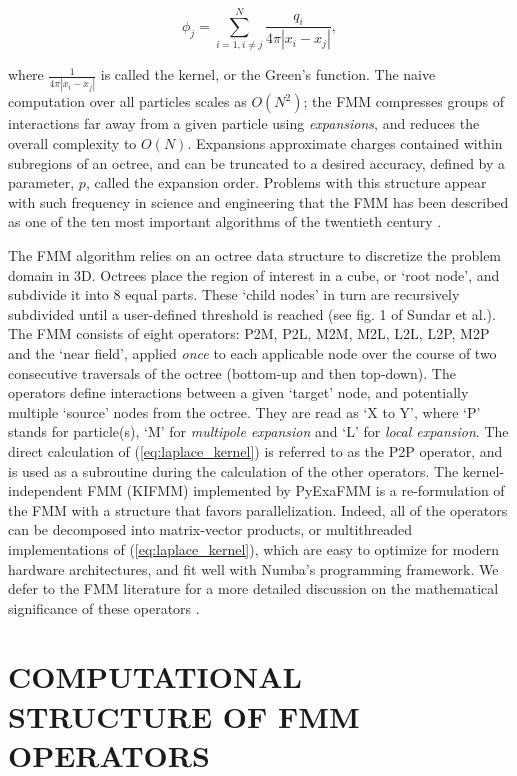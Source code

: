 \documentclass{IEEEcsmag}
\begin{document}
\begin{equation}
    \phi_j = \sum_{i=1, i \neq j}^{N} \frac{q_i}{4 \pi| x_i-x_j |},
    \label{eq:laplace_kernel}
\end{equation}

\noindent where $\frac{1}{4 \pi| x_i-x_j|}$ is called the kernel, or the Green's function. The naive computation over all particles scales as $O(N^2)$; the FMM compresses groups of interactions far away from a given particle using \textit{expansions}, and reduces the overall complexity to $O(N)$. Expansions approximate charges contained within subregions of an octree, and can be truncated to a desired accuracy, defined by a parameter, $p$, called the expansion order. Problems with this structure appear with such frequency in science and engineering that the FMM has been described as one of the ten most important algorithms of the twentieth century \cite{Dongarra2000}.

The FMM algorithm relies on an octree data structure to discretize the problem domain in 3D. Octrees place the region of interest in a cube, or `root node', and subdivide it into 8 equal parts. These `child nodes' in turn are recursively subdivided until a user-defined threshold is reached (see fig. 1 of Sundar et al.\cite{Sundar2007}). The FMM consists of eight operators: P2M, P2L, M2M, M2L, L2L, L2P, M2P and the `near field', applied \textit{once} to each applicable node over the course of two consecutive traversals of the octree (bottom-up and then top-down). The operators define interactions between a given `target' node, and potentially multiple `source' nodes from the octree. They are read as `X to Y', where `P' stands for particle(s), `M' for \textit{multipole expansion} and `L' for \textit{local expansion}. The direct calculation of (\ref{eq:laplace_kernel}) is referred to as the P2P operator, and is used as a subroutine during the calculation of the other operators. The kernel-independent FMM (KIFMM) \cite{Ying2004} implemented by PyExaFMM is a re-formulation of the FMM with a structure that favors parallelization. Indeed, all of the operators can be decomposed into matrix-vector products, or multithreaded implementations of (\ref{eq:laplace_kernel}), which are easy to optimize for modern hardware architectures, and fit well with Numba's programming framework. We defer to the FMM literature for a more detailed discussion on the mathematical significance of these operators \cite{Ying2004,Greengard1987}.

\section{COMPUTATIONAL STRUCTURE OF FMM OPERATORS}
\end{document}

